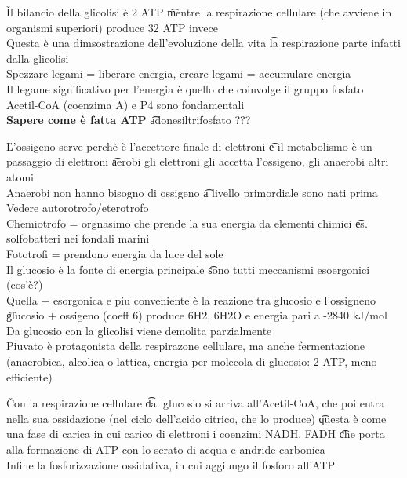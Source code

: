 \documentclass[12pt]{article}
\begin{document}
\v

Il bilancio della glicolisi è 2 ATP \t mentre la respirazione cellulare (che avviene in organismi superiori) produce 32 ATP invece \\
Questa è una dimsostrazione dell'evoluzione della vita \t la respirazione parte infatti dalla glicolisi \\
Spezzare legami = liberare energia, creare legami = accumulare energia \\
Il legame significativo per l'energia è quello che coinvolge il gruppo fosfato \\
Acetil-CoA (coenzima A) e P4 sono fondamentali \\
\textbf{Sapere come è fatta ATP} \t adonesiltrifosfato ???

\v

L'ossigeno serve perchè è l'accettore finale di elettroni \t e il metabolismo è un passaggio di elettroni \t aerobi gli elettroni gli accetta l'ossigeno, gli anaerobi altri atomi \\
Anaerobi non hanno bisogno di ossigeno \t a livello primordiale sono nati prima \\
Vedere autorotrofo/eterotrofo \\
Chemiotrofo = orgnasimo che prende la sua energia da elementi chimici \t es. solfobatteri nei fondali marini \\
Fototrofi = prendono energia da luce del sole \\
Il glucosio è la fonte di energia principale \t sono tutti meccanismi esoergonici (cos'è?) \\
Quella + esorgonica e piu conveniente è la reazione tra glucosio e l'ossigneno \t glucosio + ossigeno (coeff 6) produce 6H2, 6H2O e energia pari a -2840 kJ/mol \\
Da glucosio con la glicolisi viene demolita parzialmente \\
Piuvato è protagonista della respirazone cellulare, ma anche fermentazione (anaerobica, alcolica o lattica, energia per molecola di glucosio: 2 ATP, meno efficiente)

\v

Con la respirazione cellulare \t dal glucosio si arriva all'Acetil-CoA, che poi entra nella sua ossidazione (nel ciclo dell'acido citrico, che lo produce) \t questa è come una fase di carica in cui carico di elettroni i coenzimi NADH, FADH \t che porta alla formazione di ATP con lo scrato di acqua e andride carbonica \\
Infine la fosforizzazione ossidativa, in cui aggiungo il fosforo all'ATP
\end{document}
